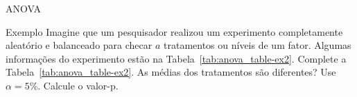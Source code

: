 \documentclass[8pt]{beamer}
\begin{document}
\begin{frame}{ANOVA}
\begin{block}{Exemplo}
	Imagine que um pesquisador realizou um experimento completamente aleatório e balanceado para checar $a$ tratamentos ou níveis de um fator. Algumas informações do experimento estão na Tabela~\ref{tab:anova_table-ex2}. Complete a Tabela~\ref{tab:anova_table-ex2}. As médias dos tratamentos são diferentes? Use $\alpha=5\%$. Calcule o valor-p.
	\begin{table}[htbp]
		\centering
		\caption{Algumas informações do experimento.}
		\label{tab:anova_table-ex2}
	\end{table}
\end{block}
\end{frame}
\end{document}
